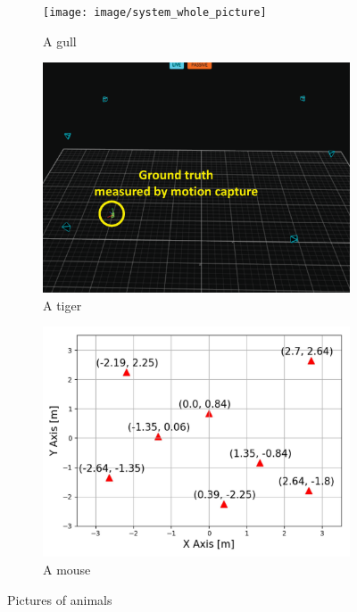 \documentclass[letterpaper, 10 pt, conference]{ieeeconf}  %
\begin{document}
\begin{figure}[h]
	\centering
	\begin{subfigure}[b]{0.3\textwidth}
		\texttt{[image: image/system\_whole\_picture]}
		\caption{A gull}
		\label{fig:whole_system}
	\end{subfigure}
	\begin{subfigure}[b]{0.3\textwidth}
		\includegraphics[width=\textwidth]{image/system_mocap}
		\caption{A tiger}
		\label{fig:Optitrack_figure}
	\end{subfigure}
	\begin{subfigure}[b]{0.3\textwidth}
		\includegraphics[width=\textwidth]{image/system_exact_position}
		\caption{A mouse}
		\label{fig:Exact_position}
	\end{subfigure}
	\caption{Pictures of animals}\label{fig:animals22}
\end{figure}
\end{document}
